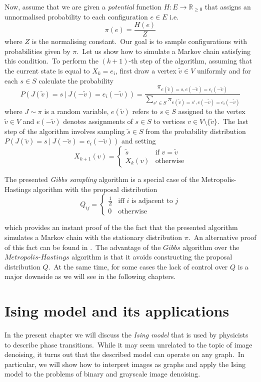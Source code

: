 \documentclass[shortabstract, english, lic]{iithesis}
\newcommand\numberedchapter[1]{\setlength\topskip{3cm}\chapter{#1}\setlength\topskip{0cm}}
\theoremstyle{default_theorem_style}\newtheorem{theorem}{Theorem}
\theoremstyle{default_theorem_style}\newtheorem{definition}{Definition}
\begin{document}
\noindent Now, assume that we are given a \textit{potential} function $H : E \to \mathbb R_{\geq 0}$ that assigns an
unnormalised probability to each configuration $e \in E$ i.e.\
$$
\pi(e) = \frac{H(e)}{Z}
$$
where $Z$ is the normalising constant.\ Our goal is to sample configurations with probabilities given by $\pi$.\ Let
us show how to simulate a Markov chain satisfying this condition.\ To
perform the $(k + 1)$-th step of the algorithm, assuming that the current state is equal to
$X_k = e_i$, first draw a vertex $\tilde{v} \in V$ uniformly and for each $s \in S$ calculate the probability
$$
P(J(\tilde{v}) = s\ |\ J(-\tilde{v})=e_i(-\tilde{v})) = \frac{\pi_{e(\tilde{v}) =
s,e(-\tilde{v}) = e_i(-\tilde{v})}}{\sum_{s' \in S} \pi_{e(\tilde{v}) = s', e(-\tilde{v}) = e_i(-\tilde{v})}}
$$
where $J \sim \pi$ is a random variable, $e(\tilde{v})$ refers to $s \in S$ assigned to the vertex $\tilde{v} \in V$ and
$e(-\tilde{v})$ denotes assignments of $s \in S$ to vertices $v \in V \setminus \{\tilde{v}\}$.\ The last step of
the algorithm involves sampling $\tilde{s} \in S$ from the probability distribution
$P(J(\tilde{v}) = s\ |\ J(-\tilde{v})=e_i(-\tilde{v}))$ and setting
$$
X_{k + 1}(v) =
\begin{cases}
  \tilde{s} &\text{if $v = \tilde{v}$}\\
  X_k(v) &\text{otherwise}
\end{cases}
$$

\noindent The presented \textit{Gibbs sampling} algorithm is a special case of the Metropolis-Hastings algorithm
with the proposal distribution
$$
Q_{ij} =
\begin{cases}
  \frac{1}{Z} &\text{iff $i$ is adjacent to $j$}\\
  0 &\text{otherwise}
\end{cases}
$$

\noindent which provides an instant proof of the the fact that the presented algorithm simulates a Markov chain with the
stationary distribution $\pi$.\ An alternative proof of this fact can be found in \cite{mcmc_book}.\ The advantage of
the $Gibbs$ algorithm over the $Metropolis$-$Hastings$ algorithm is that it avoids constructing  the proposal
distribution $Q$.\ At the same time, for some cases the lack of control over $Q$ is a major downside as we will see
in the following chapters.

\numberedchapter{Ising model and its applications}\label{chapter:ising_model}

\noindent In the present chapter we will discuss the \textit{Ising model} that is used by physicists to describe phase
transitions.\ While it may seem unrelated to the topic of image denoising, it turns out that the described model
can operate on any graph.\ In particular, we will show how to interpret images as graphs and apply the Ising model to
the problems of binary and grayscale image denoising.
\end{document}
